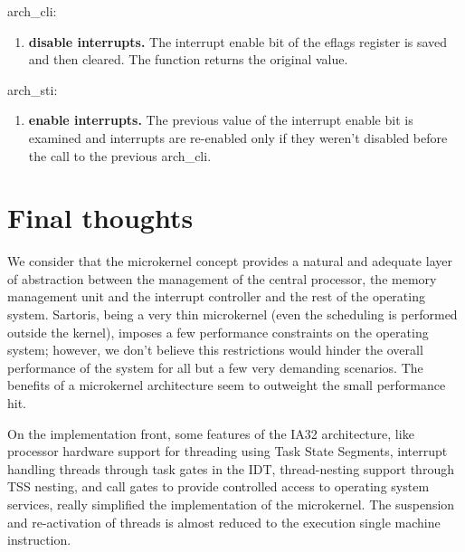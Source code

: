 \documentclass[11pt, letterpaper, twoside, english]{book}
\begin{document}
\textsf{arch\_cli}:
\begin{enumerate}
\item[]\textbf{disable interrupts.} The interrupt enable bit of the eflags register is saved and then cleared. The function returns the original value.
\end{enumerate}

\textsf{arch\_sti}:
\begin{enumerate}
\item[]\textbf{enable interrupts.} The previous value of the interrupt enable bit is examined and interrupts are re-enabled only if they weren't disabled before the call to the previous \textsf{arch\_cli}.
\end{enumerate}

\chapter{Final thoughts}

We consider that the microkernel concept provides a natural and adequate layer of abstraction between the management of the central processor, the memory management unit and the interrupt controller and the rest of the operating system. Sartoris, being  a very thin microkernel (even the scheduling is performed outside the kernel), imposes a few performance constraints on the operating system; however, we don't believe this restrictions would hinder the overall performance of the system for all but a few very demanding scenarios. The benefits of a microkernel architecture seem to outweight the small performance hit.

On the implementation front, some features of the IA32 architecture, like processor hardware support for threading using Task State Segments, interrupt handling threads through task gates in the IDT, thread-nesting support through TSS nesting, and call gates to provide controlled access to operating system services, really simplified the implementation of the microkernel. The suspension and re-activation of threads is almost reduced to the execution single machine instruction.
 
\end{document}
